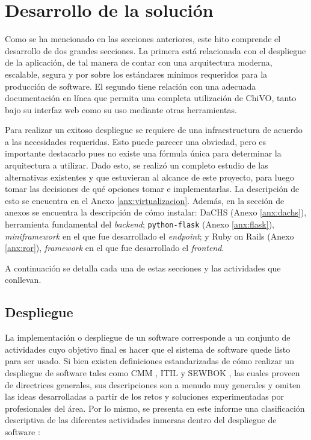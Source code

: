 \section{Desarrollo de la solución}

Como se ha mencionado en las secciones anteriores, este hito comprende el desarrollo de dos grandes secciones. La primera está relacionada con el despliegue de la aplicación, de tal manera de contar con una arquitectura moderna, escalable, segura y por sobre los estándares mínimos requeridos para la producción de software. El segundo tiene relación con una adecuada documentación en línea que permita una completa utilización de ChiVO, tanto bajo su interfaz web como su uso mediante otras herramientas.

Para realizar un exitoso despliegue se requiere de una infraestructura de acuerdo a las necesidades requeridas. Esto puede parecer una obviedad, pero es importante destacarlo pues no existe una fórmula única para determinar la arquitectura a utilizar. Dado esto, se realizó un completo estudio de las alternativas existentes y que estuvieran al alcance de este proyecto, para luego tomar las decisiones de qu\'e opciones tomar e implementarlas. La descripción de esto se encuentra en el Anexo \ref{anx:virtualizacion}. Además, en la sección de anexos se encuentra la descripción de cómo instalar: DaCHS (Anexo \ref{anx:dachs}), herramienta fundamental del \emph{backend}; \texttt{python-flask} (Anexo \ref{anx:flask}), \emph{miniframework} en el que fue desarrollado el \emph{endpoint}; y Ruby on Rails (Anexo \ref{anx:ror}), \emph{framework} en el que fue desarrollado el \emph{frontend}.

A continuación se detalla cada una de estas secciones y las actividades que conllevan.

\subsection{Despliegue}

La implementación o despliegue de un software corresponde a un conjunto de actividades cuyo objetivo final es hacer que el sistema de software quede listo para ser usado. Si bien existen definiciones estandarizadas de cómo realizar un despliegue de software tales como CMM \cite{cmm}, ITIL \cite{itil} y SEWBOK \cite{swebok}, las cuales proveen de directrices generales, sus descripciones son a menudo muy generales y omiten las ideas desarrolladas a partir de los retos y soluciones experimentadas por profesionales del área. Por lo mismo, se presenta en este informe una clasificación descriptiva de las diferentes actividades inmersas dentro del despliegue de software \cite{deployActivities}:

